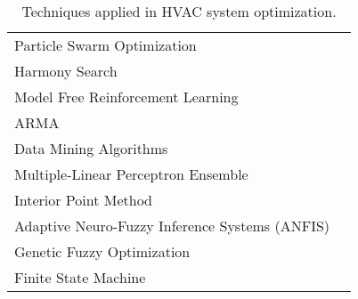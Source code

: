 \begin{table}[ht]
\begin{tabular}{p{10cm} p{5cm}}
Particle Swarm Optimization   & \cite{HeXiaofei2014}\cite{Kusiak2010ReheatBox}\cite{Kusiak2010ModelingAndOptimization}\cite{Kusiak2012ModelingAndOptimizationOfHVAC}\cite{Kusiak2011OptimizationOfAnHVACSystemWithAStrength}\cite{WeiXiupeng2015}\cite{WeiXiupeng2014ModelingAndOptimizationOfAChillerPlant}\\

Harmony Search    &  \cite{HeXiaofei2014}   \\ 

Model Free Reinforcement Learning & \cite{Henze2003EvaluationSystems}\cite{Liu2006ExperimentalFoundation} \\

ARMA   &  \cite{Jin2005Prediction-basedSystems}  \\

Data Mining Algorithms & \cite{Kusiak2011MultiObjective}\cite{Kusiak2010}\cite{Kusiak2010ReheatBox}\cite{Kusiak2010ModelingAndOptimization} \\ 

Multiple-Linear Perceptron Ensemble & \cite{Kusiak2014MinimizationOfEnergyConsumptionInHVAC}\cite{Kusiak2010ModelingAndOptimization}\cite{WeiXiupeng2015}\cite{Kusiak2013MinimizingEnergyConsumption} \\ 

Interior Point Method & \cite{Kusiak2014MinimizationOfEnergyConsumptionInHVAC} \\

Adaptive Neuro-Fuzzy Inference Systems (ANFIS) & \cite{LuLu2005HVACSystemOptimization}  \\

Genetic Fuzzy Optimization &  \cite{Parameshwaran2010EnergyAlgorithm}  \\ 

Finite State Machine &  \cite{Seem1999} \\ 

\bottomrule
\end{tabular}
\caption{Techniques applied in HVAC system optimization.}
\label{tab:Techniques}
\end{table}